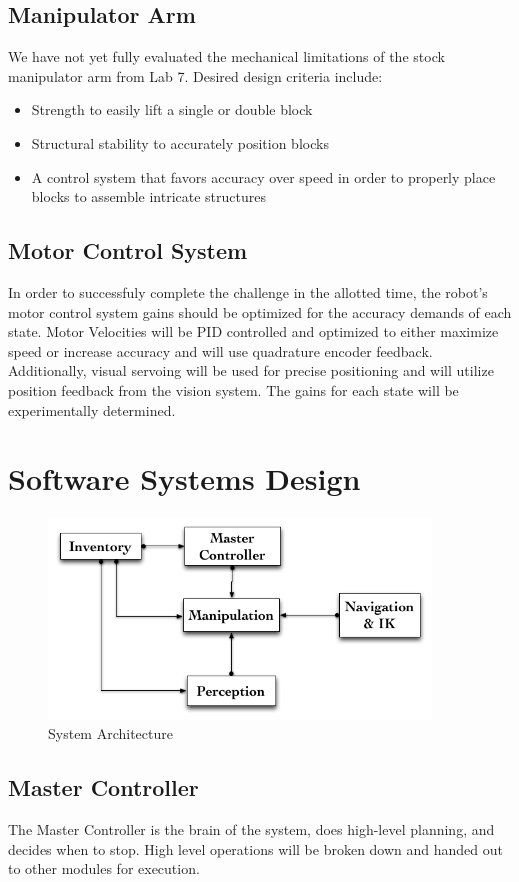 \documentclass[letterpaper,11pt]{article}
\begin{document}
\subsection{Manipulator Arm}
We have not yet fully evaluated the mechanical limitations of the stock manipulator arm from Lab 7. Desired design criteria include:
\begin{itemize}
\item Strength to easily lift a single or double block
\item Structural stability to accurately position blocks
\item A control system that favors accuracy over speed in order to properly place blocks to assemble intricate structures
\end{itemize}
\subsection {Motor Control System}
In order to successfuly complete the challenge in the allotted time, the robot's motor control system gains should be optimized for the accuracy demands of each state. Motor Velocities will be PID controlled and optimized to either maximize speed or increase accuracy and will use quadrature encoder feedback. Additionally, visual servoing will be used for precise positioning and will utilize position feedback from the vision system. The gains for each state will be experimentally determined. 
\section{Software Systems Design}
\begin{figure}[h]
\centering
 \includegraphics[width=4in]{images/System_Architecture}
\caption{System Architecture}
\end{figure}

\subsection{Master Controller}
The Master Controller is the brain of the system, does high-level planning, and decides when to stop.
High level operations will be broken down and handed out to other modules for execution.
\end{document}
